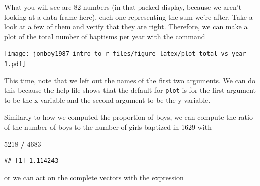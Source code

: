 \documentclass[]{article}
\newenvironment{Shaded}{\begin{snugshade}}{\end{snugshade}}
\newcommand{\KeywordTok}[1]{\textcolor[rgb]{0.13,0.29,0.53}{\textbf{#1}}}
\newcommand{\DataTypeTok}[1]{\textcolor[rgb]{0.13,0.29,0.53}{#1}}
\newcommand{\DecValTok}[1]{\textcolor[rgb]{0.00,0.00,0.81}{#1}}
\newcommand{\StringTok}[1]{\textcolor[rgb]{0.31,0.60,0.02}{#1}}
\newcommand{\OperatorTok}[1]{\textcolor[rgb]{0.81,0.36,0.00}{\textbf{#1}}}
\newcommand{\NormalTok}[1]{#1}
\begin{document}
What you will see are 82 numbers (in that packed display, because we
aren't looking at a data frame here), each one representing the sum
we're after. Take a look at a few of them and verify that they are
right. Therefore, we can make a plot of the total number of baptisms per
year with the command

\begin{Shaded}
\end{Shaded}

\texttt{[image: jonboy1987-intro\_to\_r\_files/figure-latex/plot-total-vs-year-1.pdf]}

This time, note that we left out the names of the first two arguments.
We can do this because the help file shows that the default for
\texttt{plot} is for the first argument to be the x-variable and the
second argument to be the y-variable.

Similarly to how we computed the proportion of boys, we can compute the
ratio of the number of boys to the number of girls baptized in 1629 with

\begin{Shaded}
\begin{Highlighting}[]
\DecValTok{5218} \OperatorTok{/}\StringTok{ }\DecValTok{4683}
\end{Highlighting}
\end{Shaded}

\begin{verbatim}
## [1] 1.114243
\end{verbatim}

or we can act on the complete vectors with the expression

\begin{Shaded}
\end{Shaded}
\end{document}
